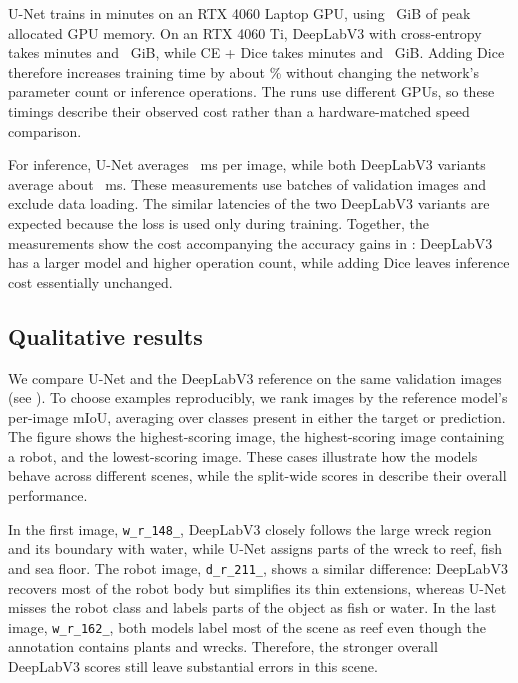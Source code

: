 U-Net trains in \unetTrainMinutes{} minutes on an RTX 4060 Laptop GPU, using
\unetPeakMemory{}~GiB of peak allocated GPU memory. On an RTX 4060 Ti,
DeepLabV3 with cross-entropy takes \deeplabCeTrainMinutes{} minutes and
\deeplabCePeakMemory{}~GiB, while CE + Dice takes
\deeplabDiceTrainMinutes{} minutes and \deeplabDicePeakMemory{}~GiB. Adding Dice
therefore increases training time by about \diceTimeOverhead\% without changing
the network's parameter count or inference operations. The runs use different
GPUs, so these timings describe their observed cost rather than a hardware-matched
speed comparison.

For inference, U-Net averages \unetLatency{}~ms per image, while both DeepLabV3
variants average about \deeplabCeLatency{}~ms. These measurements use batches of
\unetInferenceBatch{} validation images and exclude data loading. The similar
latencies of the two DeepLabV3 variants are expected because the loss is used
only during training. Together, the measurements show the cost accompanying
the accuracy gains in : DeepLabV3 has a larger model
and higher operation count, while adding Dice leaves inference cost essentially
unchanged.



\subsection{Qualitative results}
\label{sec:qualitative}
We compare U-Net and the DeepLabV3 reference on the same validation images
(see ). To choose examples reproducibly, we rank images by
the reference model's per-image mIoU, averaging over classes present in either
the target or prediction. The figure shows the highest-scoring image, the
highest-scoring image containing a robot, and the lowest-scoring image. These
cases illustrate how the models behave across different scenes, while the
split-wide scores in  describe their overall performance.

In the first image, \texttt{w\_r\_148\_}, DeepLabV3 closely follows the
large wreck region and its boundary with water, while U-Net assigns parts of
the wreck to reef, fish and sea floor. The robot image, \texttt{d\_r\_211\_},
shows a similar difference: DeepLabV3 recovers most of the robot body but
simplifies its thin extensions, whereas U-Net misses the robot class and
labels parts of the object as fish or water. In the last image,
\texttt{w\_r\_162\_}, both models label most of the scene as reef even though
the annotation contains plants and wrecks. Therefore, the stronger overall
DeepLabV3 scores still leave substantial errors in this scene.

